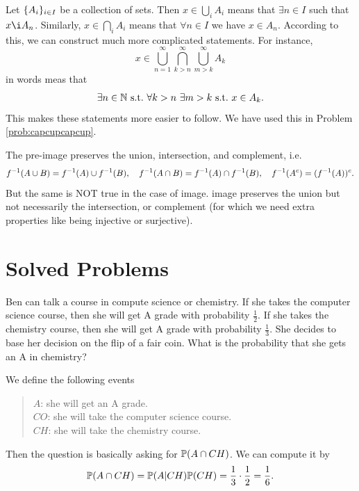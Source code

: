 \begin{summary}
	Let $ \{A_i\}_{i\in I} $ be a collection of sets. Then $ x\in \bigcup_i A_i $ means that $ \exists n \in I $ such that $ x \i A_n $. Similarly, $ x\in \bigcap_i A_i $ means that $ \forall n \in I $ we have $ x \in A_n $. According to this, we can construct much more complicated statements. For instance, 
	\[ x \in \bigcup_{n=1}^{\infty} \bigcap_{k>n}^{\infty} \bigcup_{m>k}^{\infty}{A_k} \]
	in words meas that 
	\[ \exists n \in \mathbb{N} \ \text{s.t.}\  \forall k > n \ \exists m >k \ \text{s.t.}\  x \in A_k. \]
	This makes these statements more easier to follow. We have used this in Problem \autoref{prob:capcupcapcup}.
\end{summary}

\begin{summary}
	The pre-image preserves the union, intersection, and complement, i.e.
	\[ f^{-1}(A\cup B) = f^{-1}(A) \cup f^{-1}(B), \quad f^{-1}(A\cap B) = f^{-1}(A)\cap f^{-1}(B), \quad f^{-1}(A^c) = (f^{-1}(A))^c.  \]
	But the same is NOT true in the case of image. image preserves the union but not necessarily the intersection, or complement (for which we need extra properties like being injective or surjective).
\end{summary}

\section{Solved Problems}
\begin{problem}
	Ben can talk a course in compute science or chemistry. If she takes the computer science course, then she will get A grade with probability $\frac{1}{2}$. If she takes the chemistry course, then she will get A grade with probability $\frac{1}{3}$. She decides to base her decision on the flip of a fair coin. What is the probability that she gets an A in chemistry?
\end{problem}
\begin{solution}
	We define the following events
	\begin{quote}
		$A$: she will get an A grade.\\
		$CO$: she will take the computer science course.\\
		$CH$: she will take the chemistry course.
	\end{quote}
	Then the question is basically asking for $\mathbb{P}(A \cap CH)$. We can compute it by
	\[ \mathbb{P}(A \cap CH) = \mathbb{P}(A|CH)\mathbb{P}(CH) = \frac{1}{3}\cdot\frac{1}{2} = \frac{1}{6}. \]
\end{solution}

